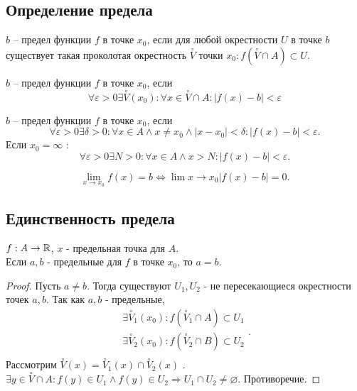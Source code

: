 \documentclass[12pt]{report}
\begin{document}
\subsection{Определение предела}\label{ques_14}
\begin{defn}
    $b$ -- предел функции $f$ в точке  $x_0$, если для любой окрестности  $U$ в точке $b$ существует такая проколотая окрестность $\stackrel{\circ} V$ точки $x_0: f(\stackrel{\circ} V\cap A) \subset U$.
\end{defn}
\begin{defn}
    $b$ -- предел функции $f$ в точке  $x_0$, если
    $$\forall \varepsilon >0 \exists \stackrel{\circ} V (x_0): \forall x \in  \stackrel{\circ} V \cap A: |f(x)-b| < \varepsilon  $$
\end{defn}
\begin{defn}
    $b$ -- предел функции $f$ в точке  $x_0$, если
    \[
	\forall \varepsilon >0 \exists \delta >0 :\forall x \in A \wedge x \ne x_0 \wedge |x-x_0|<\delta : |f(x)-b| < \varepsilon 
    .\] 
    Если $x_0 = \infty$ :
    \[
	\forall \varepsilon >0 \exists N >0 :\forall x \in A \wedge x > N : |f(x)-b| < \varepsilon 
    .\] 
\end{defn}
\begin{note}
    \[
	\lim \limits_{x \to x_0} f(x) = b \Longleftrightarrow \lim \limits{x \to x_0} |f(x) -b|=0
    .\] 
\end{note}
\subsection{Единственность предела}\label{ques_15}
\begin{thm}
    $f : A \to \mathbb{R}$, $x$ - предельная точка для $A$.\\
    Если $a, b$ - предельные для $f$ в точке $x_0$, то $a=b$.
\end{thm}
\begin{proof}
    Пусть $a\ne b$. Тогда существуют $U_1 , U_2$ - не пересекающиеся окрестности точек $a, b$. Так как $a, b$ - предельные, \[
	\begin{array}{c}
	    \exists \stackrel{\circ} V_1 (x_0): f(\stackrel{\circ} V_1 \cap A) \subset U_1 \\
	    \exists \stackrel{\circ} V_2 (x_0): f(\stackrel{\circ} V_2 \cap B) \subset U_2 \\
    \end{array}
    .\] 
    Рассмотрим $\stackrel{\circ} V(x) = \stackrel{\circ} V_1(x) \cap \stackrel{\circ} V_2(x)$ . $\exists y \in  \stackrel{\circ}V \cap A: f(y) \in  U_1 \wedge f(y) \in  U_2 \Rightarrow U_1 \cap U_2 \ne \varnothing$. Противоречие. 
\end{proof}
\end{document}
